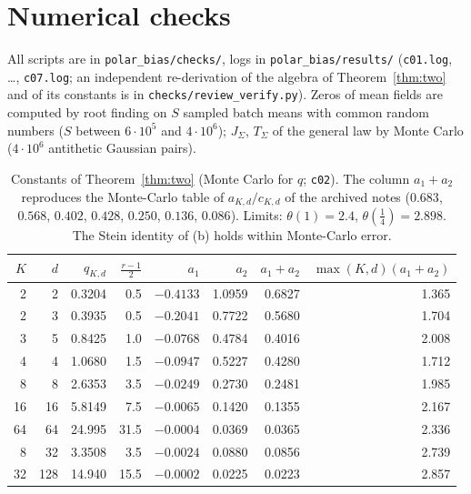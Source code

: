 \documentclass[10pt]{article}
\theoremstyle{definition}
\theoremstyle{remark}
\begin{document}
\section{Numerical checks}\label{sec:num}

All scripts are in \texttt{polar\_bias/checks/}, logs in \texttt{polar\_bias/results/} (\texttt{c01.log}, \dots, \texttt{c07.log};
an independent re-derivation of the algebra of Theorem~\ref{thm:two} and of its constants is in
\texttt{checks/review\_verify.py}). Zeros of mean fields are computed by root
finding on $S$ sampled batch means with common random numbers ($S$ between $6\cdot10^5$ and $4\cdot10^6$); $J_\Sigma$,
$T_\Sigma$ of the general law by Monte Carlo ($4\cdot10^6$ antithetic Gaussian pairs).

\begin{table}[h]
\centering\small
\begin{tabular}{@{}rrrrrrrr@{}}
\toprule
$K$ & $d$ & $q_{K,d}$ & $\frac{r-1}2$ & $a_1$ & $a_2$ & $a_1+a_2$ & $\max(K,d)(a_1+a_2)$\\
\midrule
2 & 2 & 0.3204 & 0.5 & $-0.4133$ & 1.0959 & 0.6827 & 1.365\\
2 & 3 & 0.3935 & 0.5 & $-0.2041$ & 0.7722 & 0.5680 & 1.704\\
3 & 5 & 0.8425 & 1.0 & $-0.0768$ & 0.4784 & 0.4016 & 2.008\\
4 & 4 & 1.0680 & 1.5 & $-0.0947$ & 0.5227 & 0.4280 & 1.712\\
8 & 8 & 2.6353 & 3.5 & $-0.0249$ & 0.2730 & 0.2481 & 1.985\\
16 & 16 & 5.8149 & 7.5 & $-0.0065$ & 0.1420 & 0.1355 & 2.167\\
64 & 64 & 24.995 & 31.5 & $-0.0004$ & 0.0369 & 0.0365 & 2.336\\
8 & 32 & 3.3508 & 3.5 & $-0.0024$ & 0.0880 & 0.0856 & 2.739\\
32 & 128 & 14.940 & 15.5 & $-0.0002$ & 0.0225 & 0.0223 & 2.857\\
\bottomrule
\end{tabular}
\caption{Constants of Theorem~\ref{thm:two} (Monte Carlo for $q$; \texttt{c02}). The column $a_1+a_2$ reproduces the
Monte-Carlo table of $a_{K,d}/c_{K,d}$ of the archived notes ($0.683$, $0.568$, $0.402$, $0.428$, $0.250$, $0.136$,
$0.086$). Limits: $\theta(1)=2.4$, $\theta(\frac14)=2.898$. The Stein identity of (b) holds within Monte-Carlo
error.}\label{tab:const}
\end{table}
\end{document}
